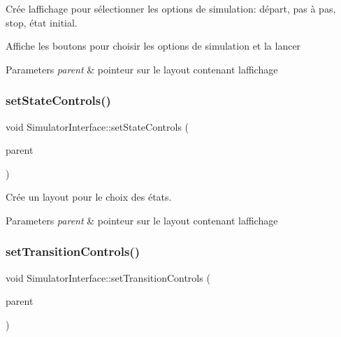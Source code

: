 Crée l\textquotesingle{}affichage pour sélectionner les options de simulation\+: départ, pas à pas, stop, état initial. 

Affiche les boutons pour choisir les options de simulation et la lancer 
\begin{DoxyParams}{Parameters}
{\em parent} & pointeur sur le layout contenant l\textquotesingle{}affichage \\
\hline
\end{DoxyParams}
\mbox{\label{class_simulator_interface_a0319645039e095dc8eb95bdf4cadb10a}} 
\subsubsection{\texorpdfstring{set\+State\+Controls()}{setStateControls()}}
{\footnotesize\ttfamily void Simulator\+Interface\+::set\+State\+Controls (\begin{DoxyParamCaption}\item[{Q\+Box\+Layout $\ast$}]{parent }\end{DoxyParamCaption})\hspace{0.3cm}{\ttfamily [protected]}}



Crée un layout pour le choix des états. 


\begin{DoxyParams}{Parameters}
{\em parent} & pointeur sur le layout contenant l\textquotesingle{}affichage \\
\hline
\end{DoxyParams}
\mbox{\label{class_simulator_interface_a320a338b1d96a6bf8e19a454d520048d}} 
\subsubsection{\texorpdfstring{set\+Transition\+Controls()}{setTransitionControls()}}
{\footnotesize\ttfamily void Simulator\+Interface\+::set\+Transition\+Controls (\begin{DoxyParamCaption}\item[{Q\+Box\+Layout $\ast$}]{parent }\end{DoxyParamCaption})\hspace{0.3cm}{\ttfamily [protected]}}



